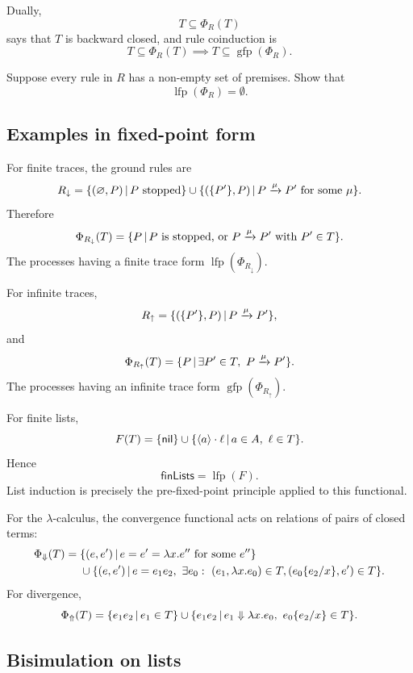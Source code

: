 \documentclass[a4paper]{article}
\newcommand{\nil}{\mathsf{nil}}
\newcommand{\trans}[1]{\xrightarrow{#1}}
\newcommand{\lfp}{\operatorname{lfp}}
\newcommand{\gfp}{\operatorname{gfp}}
\begin{document}
Dually,
\[
    T\subseteq\Phi_R(T)
\]
says that \(T\) is backward closed, and rule coinduction is
\[
    T\subseteq\Phi_R(T)
    \implies
    T\subseteq\gfp(\Phi_R).
\]

\begin{snippetexercise}{}
    Suppose every rule in \(R\) has a non-empty set of premises.
    Show that
    \[
        \lfp(\Phi_R)=\emptyset.
    \]
\end{snippetexercise}

\subsection{Examples in fixed-point form}

For finite traces, the ground rules are
\[
    R_\downarrow
    =
    \{(\emptyset,P)\suchthat P\text{ stopped}\}
    \union
    \{(\{P'\},P)\suchthat P\trans{\mu}P'\text{ for some }\mu\}.
\]
Therefore
\[
    \Phi_{R_\downarrow}(T)
    =
    \{P\suchthat P\text{ is stopped, or }P\trans{\mu}P'\text{ with }P'\in T\}.
\]
The processes having a finite trace form \(\lfp(\Phi_{R_\downarrow})\).

For infinite traces,
\[
    R_\uparrow
    =
    \{(\{P'\},P)\suchthat P\trans{\mu}P'\},
\]
and
\[
    \Phi_{R_\uparrow}(T)
    =
    \{P\suchthat \exists P'\in T,\ P\trans{\mu}P'\}.
\]
The processes having an infinite trace form \(\gfp(\Phi_{R_\uparrow})\).

For finite lists,
\[
    F(T)
    =
    \{\nil\}
    \union
    \{\langle a\rangle\cdot\ell\suchthat a\in A,\ \ell\in T\}.
\]
Hence
\[
    \mathsf{finLists}=\lfp(F).
\]
List induction is precisely the pre-fixed-point principle applied to this functional.

For the \(\lambda\)-calculus, the convergence functional acts on relations of pairs of closed terms:
\begin{align*}
    \Phi_\Downarrow(T)
    ={}&
    \{(e,e')\,|\, e=e'=\lambda x.e''\text{ for some }e''\}\\
    &\cup
    \{(e,e')\,|\, e=e_1e_2,\
    \exists e_0:\ (e_1,\lambda x.e_0)\in T,
    (e_0\{e_2/x\},e')\in T\}.
\end{align*}
For divergence,
\[
    \Phi_\Uparrow(T)
    =
    \{e_1e_2\,|\, e_1\in T\}
    \cup
    \{e_1e_2\,|\, e_1\Downarrow\lambda x.e_0,\ e_0\{e_2/x\}\in T\}.
\]

\subsection{Bisimulation on lists}
\end{document}
